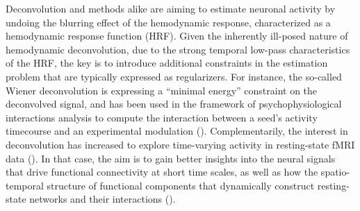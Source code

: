 Deconvolution and methods alike are aiming to estimate neuronal activity by undoing the blurring effect of the hemodynamic response, characterized as a hemodynamic response function (HRF). Given the inherently ill-posed nature of hemodynamic deconvolution, due to the strong temporal low-pass characteristics of the HRF, the key is to introduce additional constraints in the estimation problem that are typically expressed as regularizers. For instance, the so-called Wiener deconvolution is expressing a ``minimal energy'' constraint on the deconvolved signal, and has been used in the framework of psychophysiological interactions analysis to compute the interaction between a seed's activity timecourse and an experimental modulation (\citealt{Glover1999DeconvolutionImpulseResponse,Gitelman2003Modelingregionalpsychophysiologic,Gerchen2014Analyzingtaskdependent,Di2018TaskConnectomicsExamining,Freitas2020Timeresolvedeffective}). Complementarily, the interest in deconvolution has increased to explore time-varying activity in resting-state fMRI data (\citealt{Preti2017dynamicfunctionalconnectome,Keilholz2017TimeResolvedResting,Lurie2020Questionscontroversiesstudy,Bolton2020TappingMultiFaceted}). In that case, the aim is to gain better insights into the neural signals that drive functional connectivity at short time scales, as well as how the spatio-temporal structure of functional components that dynamically construct resting-state networks and their interactions (\citealt{Karahanoglu2017Dynamicslargescale}).

